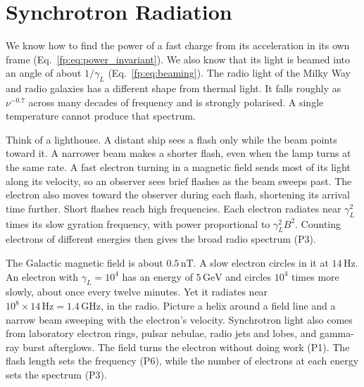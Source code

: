 \section{Synchrotron Radiation}
\label{fp:sec:sync}

We know how to find the power of a fast charge from its acceleration in its own frame (Eq.~\eqref{fp:eq:power_invariant}). We also know that its light is beamed into an angle of about $1/\gamma_L$ (Eq.~\eqref{fp:eq:beaming}). The radio light of the Milky Way and radio galaxies has a different shape from thermal light. It falls roughly as $\nu^{-0.7}$ across many decades of frequency and is strongly polarised. A single temperature cannot produce that spectrum.

Think of a lighthouse. A distant ship sees a flash only while the beam points toward it. A narrower beam makes a shorter flash, even when the lamp turns at the same rate. A fast electron turning in a magnetic field sends most of its light along its velocity, so an observer sees brief flashes as the beam sweeps past. The electron also moves toward the observer during each flash, shortening its arrival time further. Short flashes reach high frequencies. Each electron radiates near $\gamma_L^2$ times its slow gyration frequency, with power proportional to $\gamma_L^2B^2$. Counting electrons of different energies then gives the broad radio spectrum (P3).

The Galactic magnetic field is about $0.5\,\mathrm{nT}$. A slow electron circles in it at $14\,\mathrm{Hz}$. An electron with $\gamma_L=10^4$ has an energy of $5\,\mathrm{GeV}$ and circles $10^4$ times more slowly, about once every twelve minutes. Yet it radiates near $10^8\times14\,\mathrm{Hz}=1.4\,\mathrm{GHz}$, in the radio. Picture a helix around a field line and a narrow beam sweeping with the electron's velocity. Synchrotron light also comes from laboratory electron rings, pulsar nebulae, radio jets and lobes, and gamma-ray burst afterglows. The field turns the electron without doing work (P1). The flash length sets the frequency (P6), while the number of electrons at each energy sets the spectrum (P3).

